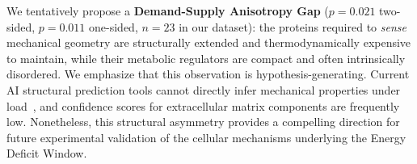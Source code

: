 We tentatively propose a \textbf{Demand-Supply Anisotropy Gap} ($p = 0.021$ two-sided, $p = 0.011$ one-sided, $n = 23$ in our dataset): the proteins required to \emph{sense} mechanical geometry are structurally extended and thermodynamically expensive to maintain, while their metabolic regulators are compact and often intrinsically disordered. We emphasize that this observation is hypothesis-generating. Current AI structural prediction tools cannot directly infer mechanical properties under load~\cite{gomes2022protein, zonta2024sequence}, and confidence scores for extracellular matrix components are frequently low. Nonetheless, this structural asymmetry provides a compelling direction for future experimental validation of the cellular mechanisms underlying the Energy Deficit Window.
